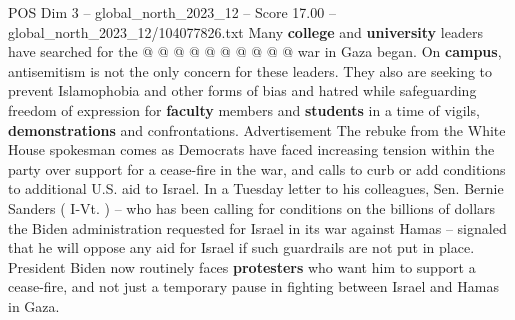 \begin{textsample}{POS Dim 3 – global\_north\_2023\_12 – Score 17.00 – global\_north\_2023\_12/104077826.txt}
Many \textbf{college} and \textbf{university} leaders have searched for the @ @ @ @ @ @ @ @ @ @ war in Gaza began.
On \textbf{campus}, antisemitism is not the only concern for these leaders.
They also are seeking to prevent Islamophobia and other forms of bias and hatred while safeguarding freedom of expression for \textbf{faculty} members and \textbf{students} in a time of vigils, \textbf{demonstrations} and confrontations.
Advertisement The rebuke from the White House spokesman comes as Democrats have faced increasing tension within the party over support for a cease-fire in the war, and calls to curb or add conditions to additional U.S. aid to Israel.
In a Tuesday letter to his colleagues, Sen.
Bernie Sanders ( I-Vt. ) -- who has been calling for conditions on the billions of dollars the Biden administration requested for Israel in its war against Hamas -- signaled that he will oppose any aid for Israel if such guardrails are not put in place.
President Biden now routinely faces \textbf{protesters} who want him to support a cease-fire, and not just a temporary pause in fighting between Israel and Hamas in Gaza.

\end{textsample}
